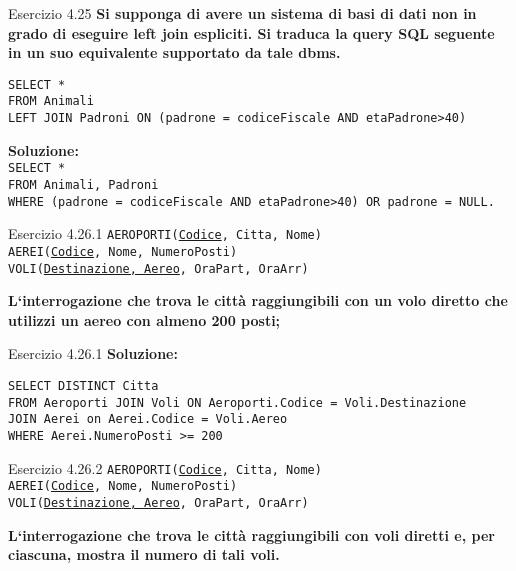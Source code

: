 \begin{frame}{Esercizio 4.25}
    \textbf{Si supponga di avere un sistema di basi di dati non in grado di
eseguire left join espliciti. Si traduca la query SQL seguente in un suo equivalente
supportato da tale dbms.}
    \vspace{1em}
    
    \texttt{SELECT *\\FROM Animali \\LEFT JOIN Padroni ON (padrone = codiceFiscale AND etaPadrone>40)}
    \vspace{1em}
    
    \textbf{Soluzione:}\\
    \texttt{SELECT *\\FROM Animali, Padroni\\WHERE (padrone = codiceFiscale AND etaPadrone>40)
OR padrone = NULL.}
\end{frame}
\begin{frame}{Esercizio 4.26.1} 
    \texttt{AEROPORTI(\underline{Codice}, Citta, Nome)\\
    AEREI(\underline{Codice}, Nome, NumeroPosti)\\
    VOLI(\underline{Destinazione, Aereo}, OraPart, OraArr)}
    \vspace{1em}
    
    \textbf{L`interrogazione che trova le citt\`a raggiungibili con un volo diretto che utilizzi
un aereo con almeno 200 posti;}
\end{frame}

\begin{frame}{Esercizio 4.26.1}
    \textbf{Soluzione:}
    \vspace{1em}
    
    \texttt{SELECT DISTINCT Citta\\FROM Aeroporti JOIN Voli ON Aeroporti.Codice = Voli.Destinazione\\JOIN Aerei on Aerei.Codice = Voli.Aereo\\WHERE Aerei.NumeroPosti >= 200}
    \end{frame}
\begin{frame}{Esercizio 4.26.2} 
    \texttt{AEROPORTI(\underline{Codice}, Citta, Nome)\\
    AEREI(\underline{Codice}, Nome, NumeroPosti)\\
    VOLI(\underline{Destinazione, Aereo}, OraPart, OraArr)}
    \vspace{1em}
    
    \textbf{L`interrogazione che trova le citt\`a raggiungibili con voli diretti e, per ciascuna,
mostra il numero di tali voli.}
\end{frame}

